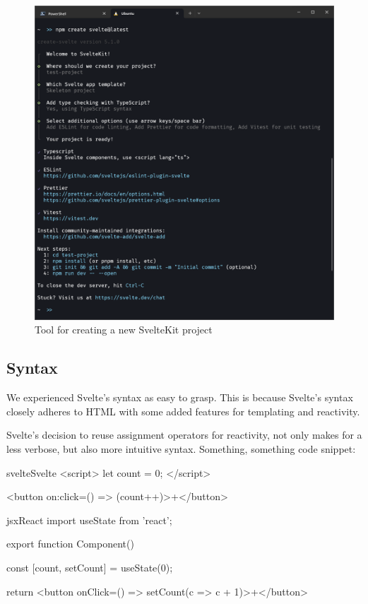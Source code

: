 \begin{figure}
    \centering
    \includegraphics[width=.95\linewidth,trim={0 15cm 0 1.5cm},clip]{assets/sveltekit-project-setup}
    \caption{Tool for creating a new SvelteKit project}
    \label{fig:project-setup}
\end{figure}

\subsection{Syntax}
We experienced Svelte's syntax as easy to grasp. This is because Svelte's syntax closely adheres to HTML with some added features for templating and reactivity.

Svelte's decision to reuse assignment operators for reactivity, not only makes for a less verbose, but also more intuitive syntax. Something, something code snippet:




\begin{myminted}{svelte}{Svelte}
<script>
    let count = 0;
</script>

<button on:click={() => (count++)}>+</button>
\end{myminted}

\begin{myminted}{jsx}{React}
import { useState } from 'react';

export function Component() {
    const [count, setCount] = useState(0);

    return <button onClick={() => setCount(c => c + 1)}>+</button>
}
\end{myminted}


